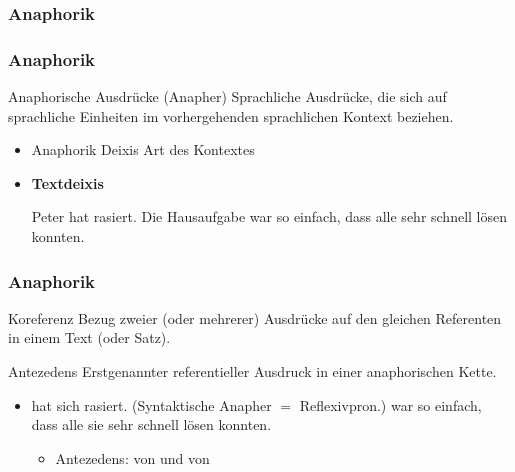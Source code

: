 %
\subsubsection{Anaphorik}
%

\begin{frame}
\frametitle{Anaphorik}

\begin{block}{Anaphorische Ausdrücke (Anapher)}
	Sprachliche Ausdrücke, die sich auf sprachliche Einheiten im vorhergehenden sprachlichen Kontext beziehen.
\end{block}

\begin{itemize}
	\item Anaphorik \vs Deixis \ras Art des Kontextes
	\medskip
	\item \textbf{Textdeixis}
	
	\eal 
	\ex Peter hat  rasiert.
	\ex Die Hausaufgabe war so einfach, dass alle  sehr schnell lösen konnten.
	\zl
	
\end{itemize}
	
\end{frame}



\begin{frame}
\frametitle{Anaphorik}

\begin{block}{Koreferenz}
	Bezug zweier (oder mehrerer) Ausdrücke auf den gleichen Referenten in einem Text (oder Satz).
\end{block}

\begin{block}{Antezedens}
	Erstgenannter referentieller Ausdruck in einer anaphorischen Kette.
\end{block}

\begin{itemize}
	\item[]
	
		\eal 
		\ex {} hat sich rasiert. (Syntaktische Anapher $=$ Reflexivpron.)
		\ex {} war so einfach, dass alle sie sehr schnell lösen konnten.
		\zl
		
		\begin{itemize}
			\item Antezedens:  von  und  von 
		\end{itemize}
	
\end{itemize}

\end{frame}


